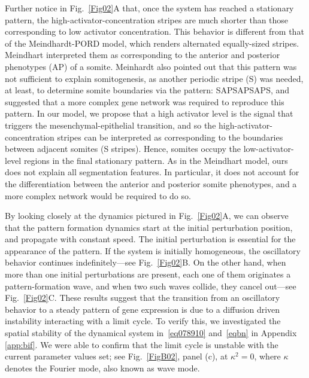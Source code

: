 \documentclass[%
 preprint,
 aip, 
 amsmath,amssymb,
]{revtex4-2}
\begin{document}
Further notice in Fig.~\ref{Fig02}A that, once the system has reached a stationary pattern, the high-activator-concentration stripes are much shorter than those corresponding to low activator concentration. This behavior is different from that of the Meindhardt-PORD model, which renders alternated equally-sized stripes. Meindhart interpreted them as corresponding to the anterior and posterior phenotypes (AP) of a somite. Meinhardt also pointed out that this pattern was not sufficient to explain somitogenesis, as another periodic stripe (S) was needed, at least, to determine somite boundaries via the pattern: SAPSAPSAPS, and suggested that a more complex gene network was required to reproduce this pattern. In our model, we propose that a high activator level is the signal that triggers the mesenchymal-epithelial transition, and so the high-activator-concentration stripes can be interpreted as corresponding to the boundaries between adjacent somites (S stripes). Hence, somites occupy the low-activator-level regions in the final stationary pattern. As in the Meindhart model, ours does not explain all segmentation features. In particular, it does not account for the differentiation between the anterior and posterior somite phenotypes, and a more complex network would be required to do so.

By looking closely at the dynamics pictured in Fig.~\ref{Fig02}A, we can observe that the pattern formation dynamics start at the initial perturbation position, and propagate with constant speed. The initial perturbation is essential for the appearance of the pattern. If the system is initially homogeneous, the oscillatory behavior continues indefinitely---see Fig.~\ref{Fig02}B. On the other hand, when more than one initial perturbations are present, each one of them originates a pattern-formation wave, and when two such waves collide, they cancel out---see Fig.~\ref{Fig02}C. These results suggest that the transition from an oscillatory behavior to a steady pattern of gene expression is due to a diffusion driven instability interacting with a limit cycle. To verify this, we investigated the spatial stability of the dynamical system in~\eqref{eq078910} and~\eqref{eqbn} in Appendix \ref{app:bif}. We were able to confirm that the limit cycle is unstable with the current parameter values set; see Fig.~\ref{FigB02}, panel (c), at $\kappa^2=0$, where $\kappa$ denotes the Fourier mode, also known as wave mode.
	
\end{document}

